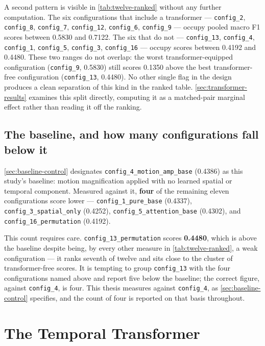 A second pattern is visible in \autoref{tab:twelve-ranked} without any further computation. The six configurations that include a transformer --- \texttt{config\_2}, \texttt{config\_8}, \texttt{config\_7}, \texttt{config\_12}, \texttt{config\_6}, \texttt{config\_9} --- occupy pooled macro F1 scores between 0.5830 and 0.7122. The six that do not --- \texttt{config\_13}, \texttt{config\_4}, \texttt{config\_1}, \texttt{config\_5}, \texttt{config\_3}, \texttt{config\_16} --- occupy scores between 0.4192 and 0.4480. These two ranges do not overlap: the worst transformer-equipped configuration (\texttt{config\_9}, 0.5830) still scores 0.1350 above the best transformer-free configuration (\texttt{config\_13}, 0.4480). No other single flag in the design produces a clean separation of this kind in the ranked table. \autoref{sec:transformer-results} examines this split directly, computing it as a matched-pair marginal effect rather than reading it off the ranking.

\subsection{The baseline, and how many configurations fall below it}
\label{sec:baseline-count}

\autoref{sec:baseline-control} designates \texttt{config\_4\_motion\_amp\_base} (0.4386) as this study's baseline: motion magnification applied with no learned spatial or temporal component. Measured against it, \textbf{four} of the remaining eleven configurations score lower --- \texttt{config\_1\_pure\_base} (0.4337), \texttt{config\_3\_spatial\_only} (0.4252), \texttt{config\_5\_attention\_base} (0.4302), and \texttt{config\_16\_permutation} (0.4192).

This count requires care. \texttt{config\_13\_permutation} scores \textbf{0.4480}, which is above the baseline despite being, by every other measure in \autoref{tab:twelve-ranked}, a weak configuration --- it ranks seventh of twelve and sits close to the cluster of transformer-free scores. It is tempting to group \texttt{config\_13} with the four configurations named above and report five below the baseline; the correct figure, against \texttt{config\_4}, is four. This thesis measures against \texttt{config\_4}, as \autoref{sec:baseline-control} specifies, and the count of four is reported on that basis throughout.


\section{The Temporal Transformer}
\label{sec:transformer-results}

